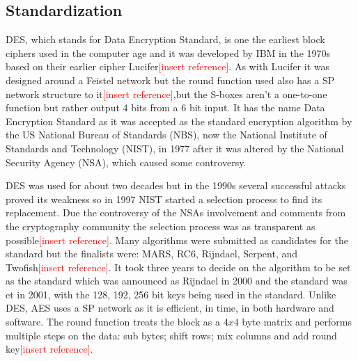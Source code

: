 \documentclass[12pt,twoside,a4paper]{report}
\begin{document}
    \subsection{Standardization}
    DES, which stands for Data Encryption Standard, is one the earliest block ciphers used in the computer age and it was developed by IBM in the 1970s based on their earlier cipher Lucifer\textcolor{red}{[insert reference]}. As with Lucifer it was designed around a Feistel network but the round function used also has a SP network structure to it\textcolor{red}{[insert reference]},but the S-boxes aren't a one-to-one function but rather output 4 bits from a 6 bit input. It has the name Data Encryption Standard as it was accepted as the standard encryption algorithm by the US National Bureau of Standards (NBS), now the National Institute of Standards and Technology (NIST), in 1977 after it was altered by the National Security Agency (NSA), which caused some controversy\cite{ComputerSecurityDivision1999}.
    
    DES was used for about two decades but in the 1990s several successful attacks proved its weakness\cite{Team} so in 1997 NIST started a selection process to find its replacement. Due the controversy of the NSAs involvement and comments from the cryptography community the selection process was as transparent as possible\textcolor{red}{[insert reference]}. Many algorithms were submitted as candidates for the standard but the finalists were: MARS, RC6, Rijndael, Serpent, and Twofish\textcolor{red}{[insert reference]}. It took three years to decide on the algorithm to be set as the standard which was announced as Rijndael in 2000 and the standard was et in 2001, with the 128, 192, 256 bit keys being used in the standard\cite{ComputerSecurityDivision2001}. Unlike DES, AES uses a SP network as it is efficient, in time, in both hardware and software. The round function treats the block as a $4x4$ byte matrix and performs multiple steps on the data: sub bytes; shift rows; mix columns and add round key\textcolor{red}{[insert reference]}.
    
\end{document}
